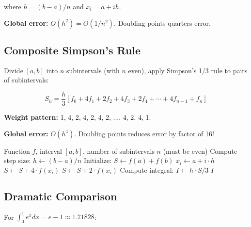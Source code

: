 where $h = (b-a)/n$ and $x_i = a + ih$.


\textbf{Global error:} $O(h^2) = O(1/n^2)$. Doubling points quarters error.


\subsection{Composite Simpson's Rule}


Divide $[a,b]$ into $n$ subintervals (with $n$ even), apply Simpson's 1/3 rule to pairs of subintervals:

\begin{equation}
    \boxed{S_n = \frac{h}{3}\left[f_0 + 4f_1 + 2f_2 + 4f_3 + 2f_4 + \cdots + 4f_{n-1} + f_n\right]}
\end{equation}

\textbf{Weight pattern:} 1, 4, 2, 4, 2, 4, 2, ..., 4, 2, 4, 1.

\textbf{Global error:} $O(h^4)$. Doubling points reduces error by factor of 16!

\begin{algorithm}[H]
\caption{Composite Simpson's Rule}
\begin{algorithmic}[1]
    \Require Function $f$, interval $[a, b]$, number of subintervals $n$ (must be even)
    \State Compute step size: $h \gets (b - a) / n$
    \State Initialize: $S \gets f(a) + f(b)$
        \State $x_i \gets a + i \cdot h$
            \State $S \gets S + 4 \cdot f(x_i)$
        \Else
            \State $S \gets S + 2 \cdot f(x_i)$
        \EndIf
    \EndFor
    \State Compute integral: $I \gets h \cdot S / 3$
    \Return $I$
\end{algorithmic}
\end{algorithm}


\subsection{Dramatic Comparison}

For $\int_0^1 e^x dx = e - 1 \approx 1.71828$:

